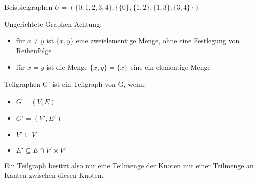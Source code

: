 \begin{frame}{Beispielgraphen}
  $U=(\{0,1,2,3,4\},\{\{0\},\{1,2\},\{1,3\},\{3,4\}\})$\\
  \begin{figure}
    \centering
  \end{figure}
\end{frame}


\begin{frame}{Ungerichtete Graphen}
  Achtung:
  \begin{itemize}
    \item für $x\not=y$ ist $\{x,y\}$ eine zweielementige Menge, ohne eine Festlegung von Reihenfolge
    \item für $x=y$ ist die Menge $\{x,y\}=\{x\}$ eine ein elementige Menge 
  \end{itemize}
\end{frame}

\begin{frame}{Teilgraphen}
  G' ist ein Teilgraph von G, wenn:
  \begin{itemize}
    \item $G=(V,E)$
    \item $G'=(V',E')$
    \item $V'\subseteq V$
    \item $E' \subseteq E \cap V' \times V'$
  \end{itemize}
  Ein Teilgraph besitzt also nur eine Teilmenge der Knoten mit einer Teilmenge an Kanten zwischen diesen Knoten.
\end{frame}

